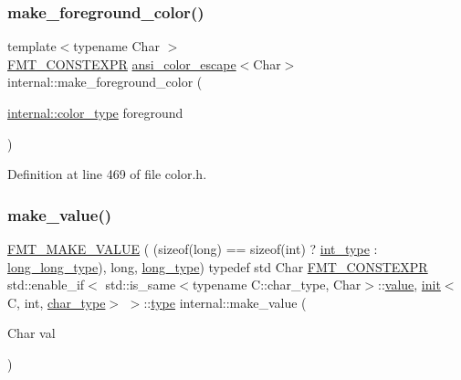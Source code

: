 \subsubsection{\texorpdfstring{make\+\_\+foreground\+\_\+color()}{make\_foreground\_color()}}
{\footnotesize\ttfamily template$<$typename Char $>$ \\
\hyperlink{core_8h_a69201cb276383873487bf68b4ef8b4cd}{F\+M\+T\+\_\+\+C\+O\+N\+S\+T\+E\+X\+PR} \hyperlink{structinternal_1_1ansi__color__escape}{ansi\+\_\+color\+\_\+escape}$<$Char$>$ internal\+::make\+\_\+foreground\+\_\+color (\begin{DoxyParamCaption}\item[{\hyperlink{structinternal_1_1color__type}{internal\+::color\+\_\+type}}]{foreground }\end{DoxyParamCaption})}



Definition at line 469 of file color.\+h.

\mbox{\label{namespaceinternal_a8db45bc77a419c9cb588d3418671c6fd}} 
\subsubsection{\texorpdfstring{make\+\_\+value()}{make\_value()}\hspace{0.1cm}{\footnotesize\ttfamily [1/8]}}
{\footnotesize\ttfamily \hyperlink{namespaceinternal_abc2b5d27eb4b4952f43ef2c96fa08146}{F\+M\+T\+\_\+\+M\+A\+K\+E\+\_\+\+V\+A\+L\+UE} ( (sizeof(long) == sizeof(int) ? \hyperlink{namespaceinternal_a8661864098ac0acff9a6dd7e66f59038a8be38ea7253d1a414964476f31d00064}{int\+\_\+type} \+: \hyperlink{namespaceinternal_a8661864098ac0acff9a6dd7e66f59038af498903f5d22c64c0160c962cbf210e1}{long\+\_\+long\+\_\+type}), long, \hyperlink{namespaceinternal_a0e92ff50bf0626d16bd3c814946ecd3d}{long\+\_\+type}) typedef std Char \hyperlink{core_8h_a69201cb276383873487bf68b4ef8b4cd}{F\+M\+T\+\_\+\+C\+O\+N\+S\+T\+E\+X\+PR} std\+::enable\+\_\+if$<$ std\+::is\+\_\+same$<$typename C\+::char\+\_\+type, Char$>$\+::\hyperlink{classinternal_1_1value}{value}, \hyperlink{structinternal_1_1init}{init}$<$C, int, \hyperlink{namespaceinternal_a8661864098ac0acff9a6dd7e66f59038a57b8984c55996e4117342a9cd2dc313e}{char\+\_\+type}$>$ $>$\+::\hyperlink{namespaceinternal_a8661864098ac0acff9a6dd7e66f59038}{type} internal\+::make\+\_\+value (\begin{DoxyParamCaption}\item[{Char}]{val }\end{DoxyParamCaption})}



